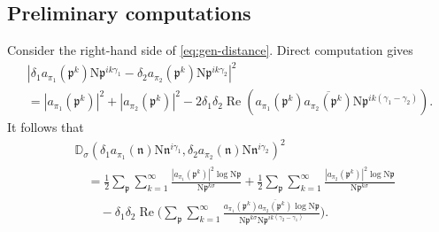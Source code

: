 \documentclass[12pt,reqno]{amsart}
\theoremstyle{remark}
\DeclareMathOperator{\Real}{Re}
\newcommand{\N}{\mathrm{N}}
\newcommand{\kp}{\mathfrak{p}}
\newcommand{\kn}{\mathfrak{n}}
\numberwithin{equation}{section}
\begin{document}
\subsection{Preliminary computations} 
    Consider the right-hand side of \eqref{eq:gen-distance}. Direct computation gives   
	\begin{multline*}
			|\delta_1 a_{\pi_1}(\kp^k)\N\kp^{ik\gamma_1}- \delta_2 a_{\pi_2}(\kp^k)\N\kp^{ik\gamma_2}|^2\\ = |a_{\pi_1}(\kp^k)|^2+|a_{\pi_2}(\kp^k)|^2 -2\delta_1\delta_2 \Real(a_{\pi_1}(\kp^k)\overline{a_{\pi_2}(\kp^k)}\N\kp^{ik(\gamma_1-\gamma_2)}).
	\end{multline*}
	 It follows that 
    \begin{equation}\label{eq:gen-distance-1}
	\begin{aligned}  
         &\mathbb{D}_{\sigma}(\delta_1 a_{\pi_1}(\kn)\N\kn^{i\gamma_1},\delta_2 a_{\pi_2}(\kn)\N\kn^{i\gamma_2})^2 \\
         &\quad = \frac{1}{2} \sum_{\kp} \sum_{k=1}^{\infty} \frac{|a_{\pi_1}(\kp^k)|^2\log \N\kp} {\N\kp^{k\sigma}} 
         + \frac{1}{2} \sum_{\kp} \sum_{k=1}^{\infty} \frac{|a_{\pi_2}(\kp^k)|^2\log \N\kp} {\N\kp^{k\sigma}} \\ 
         &\qquad - \delta_1\delta_2 \Real\Big(\sum_{\kp} \sum_{k=1}^{\infty}\frac{a_{\pi_1}(\kp^k)\overline{a_{\pi_2}(\kp^k)}\log \N\kp} {\N\kp^{k\sigma}\N\kp^{ik(\gamma_2-\gamma_1)}}\Big).
        \end{aligned}
	\end{equation}
    
\end{document}
